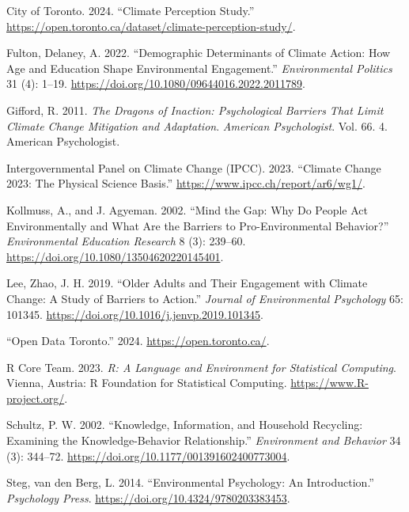 \documentclass[
  letterpaper,
  DIV=11,
  numbers=noendperiod]{scrartcl}
\newlength{\cslhangindent}
\newenvironment{CSLReferences}[2] %
 {\begin{list}{}{%
  \setlength{\itemindent}{0pt}
  \setlength{\leftmargin}{0pt}
  \setlength{\parsep}{0pt}
  \ifodd #1
   \setlength{\leftmargin}{\cslhangindent}
   \setlength{\itemindent}{-1\cslhangindent}
  \fi
  \setlength{\itemsep}{#2\baselineskip}}}
 {\end{list}}
\begin{document}
\label{refs}
\begin{CSLReferences}{1}{0}
City of Toronto. 2024. {``Climate Perception Study.''}
\url{https://open.toronto.ca/dataset/climate-perception-study/}.

Fulton, Delaney, A. 2022. {``Demographic Determinants of Climate Action:
How Age and Education Shape Environmental Engagement.''}
\emph{Environmental Politics} 31 (4): 1--19.
\url{https://doi.org/10.1080/09644016.2022.2011789}.

Gifford, R. 2011. \emph{The Dragons of Inaction: Psychological Barriers
That Limit Climate Change Mitigation and Adaptation}. \emph{American
Psychologist}. Vol. 66. 4. American Psychologist.

Intergovernmental Panel on Climate Change (IPCC). 2023. {``Climate
Change 2023: The Physical Science Basis.''}
\url{https://www.ipcc.ch/report/ar6/wg1/}.

Kollmuss, A., and J. Agyeman. 2002. {``Mind the Gap: Why Do People Act
Environmentally and What Are the Barriers to Pro-Environmental
Behavior?''} \emph{Environmental Education Research} 8 (3): 239--60.
\url{https://doi.org/10.1080/13504620220145401}.

Lee, Zhao, J. H. 2019. {``Older Adults and Their Engagement with Climate
Change: A Study of Barriers to Action.''} \emph{Journal of Environmental
Psychology} 65: 101345.
\url{https://doi.org/10.1016/j.jenvp.2019.101345}.

{``Open Data Toronto.''} 2024. \url{https://open.toronto.ca/}.

R Core Team. 2023. \emph{{R: A Language and Environment for Statistical
Computing}}. Vienna, Austria: R Foundation for Statistical Computing.
\url{https://www.R-project.org/}.

Schultz, P. W. 2002. {``Knowledge, Information, and Household Recycling:
Examining the Knowledge-Behavior Relationship.''} \emph{Environment and
Behavior} 34 (3): 344--72.
\url{https://doi.org/10.1177/001391602400773004}.

Steg, van den Berg, L. 2014. {``Environmental Psychology: An
Introduction.''} \emph{Psychology Press}.
\url{https://doi.org/10.4324/9780203383453}.


\end{CSLReferences}
\end{document}
